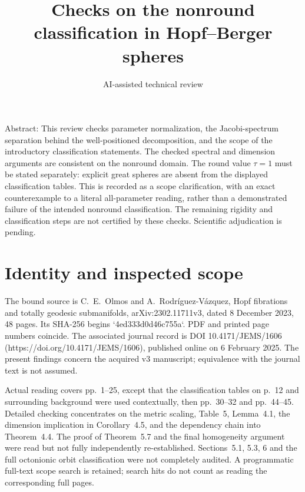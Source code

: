 \documentclass[10pt]{article}
\title{Checks on the nonround classification
in Hopf–Berger spheres}
\author{AI-assisted technical review}
\date{}
\begin{document}
\maketitle
Abstract: This review checks parameter normalization, the Jacobi-spectrum separation behind the well-positioned decomposition, and the scope of the introductory classification statements. The checked spectral and dimension arguments are consistent on the nonround domain. The round value \(\tau=1\) must be stated separately: explicit great spheres are absent from the displayed classification tables. This is recorded as a scope clarification, with an exact counterexample to a literal all-parameter reading, rather than a demonstrated failure of the intended nonround classification. The remaining rigidity and classification steps are not certified by these checks. Scientific adjudication is pending.\par
\section*{Identity and inspected scope}
The bound source is C. E. Olmos and A. Rodríguez-Vázquez, Hopf fibrations and totally geodesic submanifolds, arXiv:2302.11711v3, dated 8 December 2023, 48 pages. Its SHA-256 begins `4ed333d0d46c755a`. PDF and printed page numbers coincide. The associated journal record is DOI 10.4171/JEMS/1606 (https://doi.org/10.4171/JEMS/1606), published online on 6 February 2025. The present findings concern the acquired v3 manuscript; equivalence with the journal text is not assumed.\par
Actual reading covers pp. 1–25, except that the classification tables on p. 12 and surrounding background were used contextually, then pp. 30–32 and pp. 44–45. Detailed checking concentrates on the metric scaling, Table 5, Lemma 4.1, the dimension implication in Corollary 4.5, and the dependency chain into Theorem 4.4. The proof of Theorem 5.7 and the final homogeneity argument were read but not fully independently re-established. Sections 5.1, 5.3, 6 and the full octonionic orbit classification were not completely audited. A programmatic full-text scope search is retained; search hits do not count as reading the corresponding full pages.\par
\end{document}
